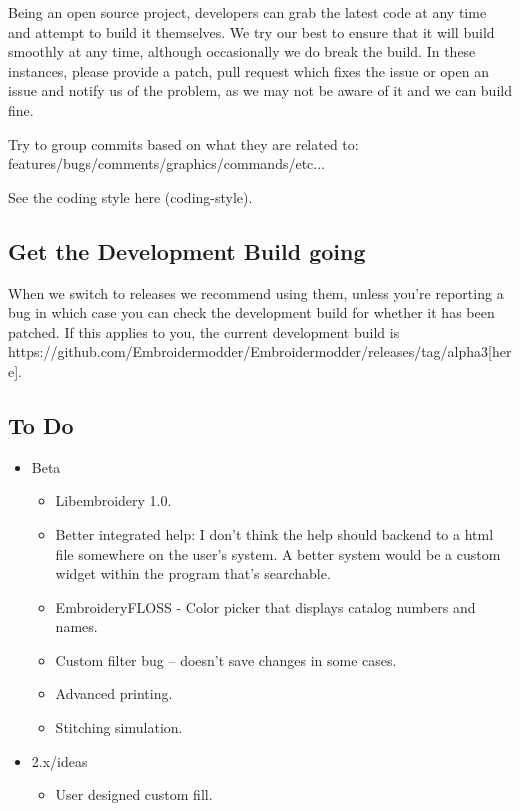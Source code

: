 \documentclass[10pt]{report}
\begin{document}
Being an open source project, developers can grab the latest code at any time
and attempt to build it themselves. We try our best to ensure that it will build smoothly
at any time, although occasionally we do break the build. In these instances,
please provide a patch, pull request which fixes the issue or open an issue and
notify us of the problem, as we may not be aware of it and we can build fine.

Try to group commits based on what they are related to: features/bugs/comments/graphics/commands/etc...

See the coding style  here (coding-style).

\subsection{Get the Development Build going}

When we switch to releases we recommend using them, unless you're reporting a bug in which case you can check the development build for whether it has been patched. If this applies to you, the current development build is https://github.com/Embroidermodder/Embroidermodder/releases/tag/alpha3[here].

\subsection{To Do}

\begin{itemize}
\item Beta
\begin{itemize}
\item Libembroidery 1.0.
\item Better integrated help: I don't think the help should backend to a html file somewhere on the user's system. A better system would be a custom widget within the program that's searchable.
\item EmbroideryFLOSS - Color picker that displays catalog numbers and names.
\item Custom filter bug -- doesn't save changes in some cases.
\item Advanced printing.
\item Stitching simulation.
\end{itemize}
\item 2.x/ideas
\begin{itemize}
\item User designed custom fill.
\end{itemize}
\end{itemize}
\end{document}
